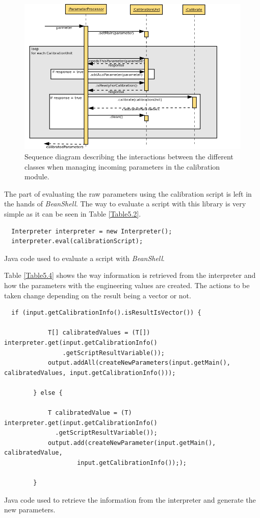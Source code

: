 \begin{figure}[H]
\centerline{\includegraphics[width=1.2\textwidth]{images/ReceiveParameterAndCalibrateSequence.png}}
\caption{Sequence diagram describing the interactions between the different classes when managing incoming parameters in the calibration module.}
\label{f5.6}
\end{figure}


The part of evaluating the raw parameters using the calibration script is left in the hands of \emph{BeanShell}. The way to evaluate a script with this library is very simple as it can be seen in Table \ref{Table5.2}. 


\begin{table}[h]
\lstset{language=Java}
\begin{lstlisting}
  Interpreter interpreter = new Interpreter();
  interpreter.eval(calibrationScript);
\end{lstlisting}
\caption{Java code used to evaluate a script with \emph{BeanShell}.}
\label{Table5.2}
\end{table}


Table \ref{Table5.4} shows the way information is retrieved from the interpreter and how the parameters with the engineering values are created. The actions to be taken change depending on the result being a vector or not.

\begin{table}[h]
\lstset{language=Java}
\begin{lstlisting}
  if (input.getCalibrationInfo().isResultIsVector()) {

            T[] calibratedValues = (T[]) interpreter.get(input.getCalibrationInfo()
                .getScriptResultVariable());
            output.addAll(createNewParameters(input.getMain(), calibratedValues, input.getCalibrationInfo()));

        } else {

            T calibratedValue = (T) interpreter.get(input.getCalibrationInfo()
              .getScriptResultVariable());
            output.add(createNewParameter(input.getMain(), calibratedValue,
                    input.getCalibrationInfo()););

        }
\end{lstlisting}
\caption{Java code used to retrieve the information from the interpreter and generate the new parameters.}
\label{Table5.4}
\end{table}


